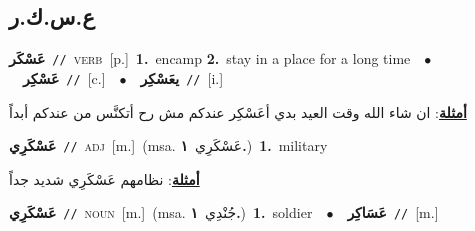 \documentclass[10pt,a4paper,twoside]{article} %
\begin{document}
\begin{multicols}{2}
\vspace{-3mm}
\subsection*{\color{blue}\foreignlanguage{arabic}{ع.س.ك.ر}\color{blue}{}} 

{\setlength\topsep{0pt}\textbf{\foreignlanguage{arabic}{عَسْكَر}}\ {\color{gray}\texttt{//}\color{black}}\ \textsc{verb}\ [p.]\ \textbf{1.}~encamp  \textbf{2.}~stay in a place for a long time\ \ $\bullet$\ \ \setlength\topsep{0pt}\textbf{\foreignlanguage{arabic}{عَسْكِر}}\ {\color{gray}\texttt{//}\color{black}}\ [c.]\ \ $\bullet$\ \ \setlength\topsep{0pt}\textbf{\foreignlanguage{arabic}{يعَسْكِر}}\ {\color{gray}\texttt{//}\color{black}}\ [i.]\  \begin{flushright}\color{gray}\foreignlanguage{arabic}{\textbf{\underline{\foreignlanguage{arabic}{أمثلة}}}: ان شاء الله وقت العيد بدي أعَسْكِر عندكم مش رح أتكنَّس من عندكم أبداً}\end{flushright}\color{black}} \vspace{2mm}

{\setlength\topsep{0pt}\textbf{\foreignlanguage{arabic}{عَسْكَرِي}}\ {\color{gray}\texttt{//}\color{black}}\ \textsc{adj}\ [m.]\ \color{gray}(msa. \foreignlanguage{arabic}{عَسْكَرِي}~\foreignlanguage{arabic}{\textbf{١.}})\color{black}\ \textbf{1.}~military\  \begin{flushright}\color{gray}\foreignlanguage{arabic}{\textbf{\underline{\foreignlanguage{arabic}{أمثلة}}}: نظامهم عَسْكَرِي شديد جداً}\end{flushright}\color{black}} \vspace{2mm}

{\setlength\topsep{0pt}\textbf{\foreignlanguage{arabic}{عَسْكَرِي}}\ {\color{gray}\texttt{//}\color{black}}\ \textsc{noun}\ [m.]\ \color{gray}(msa. \foreignlanguage{arabic}{جُنْدِي}~\foreignlanguage{arabic}{\textbf{١.}})\color{black}\ \textbf{1.}~soldier\ \ $\bullet$\ \ \setlength\topsep{0pt}\textbf{\foreignlanguage{arabic}{عَسَاكِر}}\ {\color{gray}\texttt{//}\color{black}}\ [m.]\ } \vspace{2mm}


\end{multicols}
\end{document}

